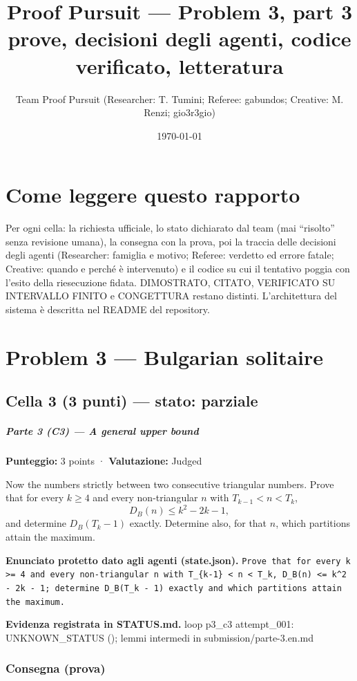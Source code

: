 \documentclass[11pt,a4paper]{article}
\title{Proof Pursuit --- Problem 3, part 3\\ \large prove, decisioni degli agenti, codice verificato, letteratura}
\author{Team Proof Pursuit (Researcher: T. Tumini; Referee: gabundos; Creative: M. Renzi; gio3r3gio)}
\date{\today}
\begin{document}
\maketitle\tableofcontents
\section*{Come leggere questo rapporto}
Per ogni cella: la richiesta ufficiale, lo stato dichiarato dal team (mai ``risolto'' senza revisione umana), la consegna
con la prova, poi la traccia delle decisioni degli agenti (Researcher: famiglia e motivo; Referee: verdetto ed errore
fatale; Creative: quando e perché è intervenuto) e il codice su cui il tentativo poggia con l'esito della riesecuzione
fidata. DIMOSTRATO, CITATO, VERIFICATO SU INTERVALLO FINITO e CONGETTURA restano distinti. L'architettura del sistema
è descritta nel README del repository.
\section{Problem 3 — Bulgarian solitaire}
\subsection{Cella 3 (3 punti) — stato: parziale}
\subparagraph{Parte 3 (C3) --- A general upper
bound}\label{parte-3-c3-a-general-upper-bound}

\textbf{Punteggio:} 3 points · \textbf{Valutazione:} Judged

Now the numbers strictly between two consecutive triangular numbers.
Prove that for every \(k \ge 4\) and every non-triangular \(n\) with
\(T_{k-1} < n < T_k\), \[
D_B(n) \le k^2 - 2k - 1,
\] and determine \(D_B(T_k - 1)\) exactly. Determine also, for that
\(n\), which partitions attain the maximum.

\textbf{Enunciato protetto dato agli agenti (state.json).} \texttt{Prove that for every k \textgreater{}= 4 and every non-triangular n with T\_\{k-1\} \textless{} n \textless{} T\_k, D\_B(n) \textless{}= k\textasciicircum{}2 - 2k - 1; determine D\_B(T\_k - 1) exactly and which partitions attain the maximum.}

\textbf{Evidenza registrata in STATUS.md.} loop p3\_c3 attempt\_001: UNKNOWN\_STATUS (); lemmi intermedi in submission/parte-3.en.md

\subsubsection{Consegna (prova)}
\end{document}
